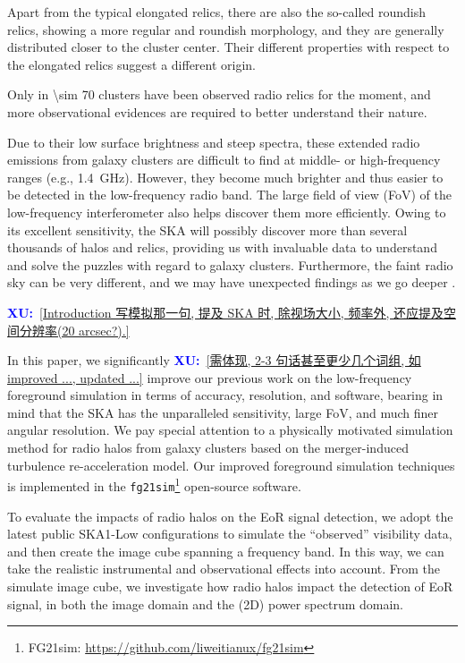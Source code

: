 \documentclass[modern]{aastex61}
\newcommand{\XU}[1]{\textcolor{blue}{\textbf{XU:}}~\uline{#1}}
\begin{document}
\begin{description}
    Apart from the typical elongated relics, there are also the so-called
    roundish relics, showing a more regular and roundish morphology,
    and they are generally distributed closer to the cluster center.
    Their different properties with respect to the elongated relics
    suggest a different origin.

    Only in \num{\sim 70} clusters have been observed radio relics
    \citep[their Table 1]{nuza2017} for the moment, and more observational
    evidences are required to better understand their nature.
\end{description}

Due to their low surface brightness and steep spectra, these extended
radio emissions from galaxy clusters are difficult to find at middle-
or high-frequency ranges (e.g., \SI{1.4}{\GHz}).
However, they become much brighter and thus easier to be detected in
the low-frequency radio band.  The large field of view (FoV) of the
low-frequency interferometer also helps discover them more efficiently.
Owing to its excellent sensitivity, the SKA will possibly discover more
than several thousands of halos and relics, providing us with invaluable
data to understand and solve the puzzles with regard to galaxy clusters.
Furthermore, the faint radio sky can be very different, and we may have
unexpected findings as we go deeper \citep{padovani2016rev,herreraRuiz2017}.

\XU{[Introduction 写模拟那一句, 提及 SKA 时, 除视场大小, 频率外,
  还应提及空间分辨率(20 arcsec?).]}

In this paper, we significantly \XU{[需体现, 2-3 句话甚至更少几个词组,
  如 improved ..., updated ...]}
improve our previous work \citep{wang2010}
on the low-frequency foreground simulation in terms of accuracy, resolution,
and software, bearing in mind that the SKA has the unparalleled sensitivity,
large FoV, and much finer angular resolution.
We pay special attention to a physically motivated simulation method
for radio halos from galaxy clusters based on the merger-induced
turbulence re-acceleration model.
Our improved foreground simulation techniques is implemented in the
\texttt{fg21sim}\footnote{FG21sim:
  \url{https://github.com/liweitianux/fg21sim}} open-source software.

To evaluate the impacts of radio halos on the EoR signal detection,
we adopt the latest public SKA1-Low configurations to simulate the
``observed'' visibility data, and then create the image cube spanning
a frequency band.
In this way, we can take the realistic instrumental and observational
effects into account.
From the simulate image cube, we investigate how radio halos impact
the detection of EoR signal, in both the image domain and the (2D)
power spectrum domain.
\end{document}
